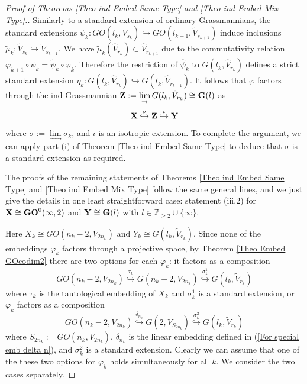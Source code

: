 \documentclass[12pt]{amsart}
\def\ZZ {{\mathbb Z}}     %
\def\hw  {\hookrightarrow}
\begin{document}
\begin{proof}[Proof of Theorems \ref{Theo ind Embed Same Type} and \ref{Theo ind Embed Mix Type}.]
Similarly to a standard extension of ordinary Grassmannians, the standard extensions $\tilde\psi_k:GO(l_k,\tilde V_{s_k})\hw GO(l_{k+1},\tilde V_{s_{k+1}})$ induce inclusions $\tilde\mu_k:\tilde V_{s_k}\hw \tilde V_{s_{k+1}}$. We have $\tilde\mu_k(\hat V_{r_k})\subset \hat V_{r_{k+1}}$ due to the commutativity relation $\varphi_{k+1}\circ\psi_k=\tilde\psi_k\circ\varphi_k$. Therefore the restriction of $\hat\psi_k$ to $G(l_k,\hat V_{r_k})$ defines a strict standard extension $\eta_k: G(l_k,\hat V_{r_k})\hw G(l_k,\hat V_{r_{k+1}})$. It follows that $\varphi$ factors through the ind-Grassmannian ${\bf Z}:=\lim\limits_{\to} G(l_k,\hat V_{r_k})\cong {\bf G}(l)$ as
$$
{\bf X}\stackrel{\sigma}{\hw} {\bf Z} \stackrel{\iota}{\hw} {\bf Y}
$$
where $\sigma:=\lim\limits_\to \sigma_k$, and $\iota$ is an isotropic extension. To complete the argument, we can apply part (i) of Theorem \ref{Theo ind Embed Same Type} to deduce that $\sigma$ is a standard extension as required.


The proofs of the remaining statements of Theorems \ref{Theo ind Embed Same Type} and \ref{Theo ind Embed Mix Type} follow the same general lines, and we just give the details in one least straightforward case: statement (iii.2) for ${\bf X}\cong{\bf GO}^0(\infty,2)$ and ${\bf Y}\cong{\bf G}(l)$ with $l\in\ZZ_{\geq 2}\cup\{\infty\}$. 

Here $X_k\cong GO(n_k-2, V_{2n_k})$ and $Y_k\cong G(l_k,\tilde V_{r_k})$. Since none of the embeddings $\varphi_k$ factors through a projective space, by Theorem \ref{Theo Embed GOcodim2} there are two options for each $\varphi_k$: it factors as a composition
$$
GO(n_k-2,V_{2n_k}) \stackrel{\tau_{k}}{\hw} G(n_k-2,V_{2n_k}) \stackrel{\sigma^1_k}{\hw} G(l_k,\tilde V_{r_k})
$$
where $\tau_{k}$ is the tautological embedding of $X_k$ and $\sigma^1_k$ is a standard extension, or $\varphi_k$ factors as a composition
$$
GO(n_k-2,V_{2n_k}) \stackrel{\delta_{n_k}}{\hw} G(2,V_{S_{2n_k}}) \stackrel{\sigma^2_k}{\hw} G(l_k,\tilde V_{r_k})
$$
where $S_{2n_k}:=GO(n_k,V_{2n_k})$, $\delta_{n_k}$ is the linear embedding defined in (\ref{For special emb delta n}), and $\sigma^2_k$ is a standard extension. Clearly we can assume that one of the these two options for $\varphi_k$ holds simultaneously for all $k$. We consider the two cases separately.


\end{proof}
\end{document}
